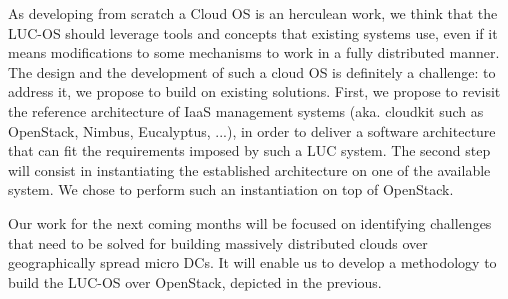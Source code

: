 As developing from scratch a Cloud OS is an herculean work, we think that the 
LUC-OS should leverage tools and concepts that existing systems use, even if 
it means modifications to some mechanisms to work in a fully distributed manner.
The design and the development of such a cloud OS is definitely a challenge: to 
address it, we propose to build on existing solutions. First, we propose 
to revisit the reference architecture of IaaS management systems (aka. cloudkit 
such as OpenStack, Nimbus, Eucalyptus, ...), in order to deliver a software 
architecture that can fit the requirements imposed by such a LUC system. The 
second step will consist in instantiating the established architecture on one of
the available system. We chose to perform such an instantiation on top of 
OpenStack. 

Our work for the next coming months will be focused on identifying challenges 
that need to be solved for building massively distributed clouds over 
geographically spread micro DCs. It will enable us to develop a methodology to 
build the LUC-OS over OpenStack, depicted in the previous.